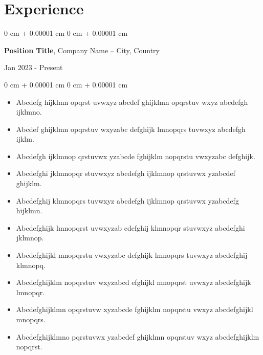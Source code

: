 \documentclass[11pt, letterpaper]{article}
\newenvironment{highlights}{
    \begin{itemize}[
        topsep=0.08 cm,
        parsep=0.08 cm,
        partopsep=0pt,
        itemsep=0pt,
        leftmargin=0.2 cm + 17pt
    ]
}
{
    \end{itemize}
}
\newenvironment{onecolentry}{
    \begin{adjustwidth}{
        0 cm + 0.00001 cm
    }{
        0 cm + 0.00001 cm
    }
}{
    \end{adjustwidth}
}
\newenvironment{twocolentry}[2][]{
    \onecolentry
    \def\secondColumn{#2}
    \setcolumnwidth{\fill, 4.5 cm}
    \begin{paracol}{2}
}{
    \switchcolumn \raggedleft \secondColumn
    \end{paracol}
    \endonecolentry
}
\begin{document}
\section{Experience}
\vspace{0.08 cm}
\begin{twocolentry}{Jan 2023 - Present}
    {\textbf{Position Title}}, Company Name -- City, Country
\end{twocolentry}
\vspace{0.05 cm}
\begin{onecolentry}
    \begin{highlights}
        \item Abcdefg hijklmn opqrst uvwxyz abcdef ghijklmn opqrstuv wxyz abcdefgh ijklmno.
        \item Abcdef ghijklmn opqrstuv wxyzabc defghijk lmnopqrs tuvwxyz abcdefgh ijklm.
        \item Abcdefgh ijklmnop qrstuvwx yzabcde fghijklm nopqrstu vwxyzabc defghijk.
        \item Abcdefghi jklmnopqr stuvwxyz abcdefgh ijklmnop qrstuvwx yzabcdef ghijklm.
        \item Abcdefghij klmnopqrs tuvwxyz abcdefgh ijklmnop qrstuvwx yzabcdefg hijklmn.
        \item Abcdefghijk lmnopqrst uvwxyzab cdefghij klmnopqr stuvwxyz abcdefghi jklmnop.
        \item Abcdefghijkl mnopqrstu vwxyzabc defghijk lmnopqrs tuvwxyz abcdefghij klmnopq.
        \item Abcdefghijklm nopqrstuv wxyzabcd efghijkl mnopqrst uvwxyz abcdefghijk lmnopqr.
        \item Abcdefghijklmn opqrstuvw xyzabcde fghijklm nopqrstu vwxyz abcdefghijkl mnopqrs.
        \item Abcdefghijklmno pqrstuvwx yzabcdef ghijklmn opqrstuv wxyz abcdefghijklm nopqrst.
    \end{highlights}
\end{onecolentry}
\vspace{0.35 cm}
\end{document}
